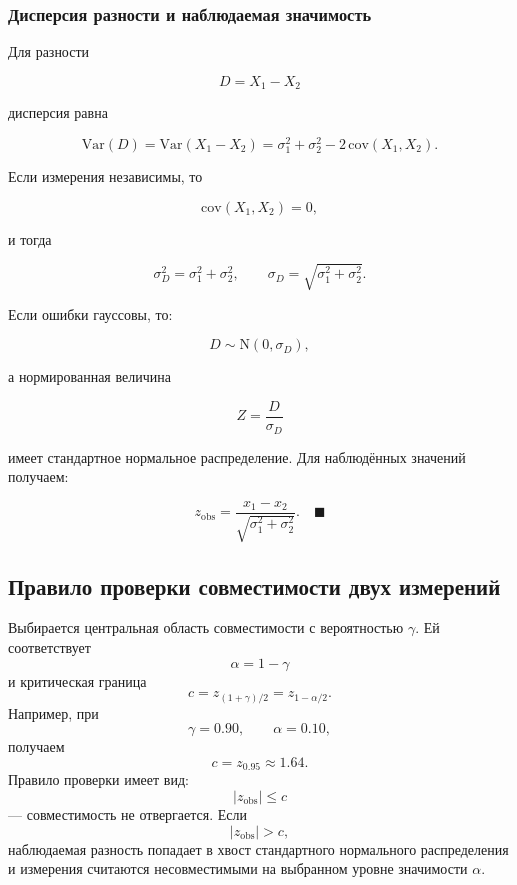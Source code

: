\documentclass[
  russian,
  12pt,
  a4paper,
  a4paper,
  openany]{scrbook}
\begin{document}
\begin{bookderivation}

\subsubsection{Дисперсия разности и наблюдаемая
значимость}\label{ux434ux438ux441ux43fux435ux440ux441ux438ux44f-ux440ux430ux437ux43dux43eux441ux442ux438-ux438-ux43dux430ux431ux43bux44eux434ux430ux435ux43cux430ux44f-ux437ux43dux430ux447ux438ux43cux43eux441ux442ux44c}

Для разности

\[D=X_1-X_2\]

дисперсия равна

\[\mathrm{Var}(D)
=\mathrm{Var}(X_1-X_2)=
\sigma_1^2+
\sigma_2^2-
2\,\mathrm{cov}(X_1,X_2).\]

Если измерения независимы, то

\[\mathrm{cov}(X_1,X_2)=0,\]

и тогда

\[\boxed{
\sigma_D^2=\sigma_1^2+\sigma_2^2,
\qquad
\sigma_D=\sqrt{\sigma_1^2+\sigma_2^2}.
}\]

Если ошибки гауссовы, то:

\[D\sim\mathrm{N}(0,\sigma_D),\]

а нормированная величина

\[Z=\frac{D}{\sigma_D}\]

имеет стандартное нормальное распределение. Для наблюдённых значений
получаем:

\[\boxed{
z_{\mathrm{obs}}
=
\frac{x_1-x_2}{\sqrt{\sigma_1^2+\sigma_2^2}}.
}\quad\blacksquare\]

\end{bookderivation}

\subsection{Правило проверки совместимости двух
измерений}\label{ux43fux440ux430ux432ux438ux43bux43e-ux43fux440ux43eux432ux435ux440ux43aux438-ux441ux43eux432ux43cux435ux441ux442ux438ux43cux43eux441ux442ux438-ux434ux432ux443ux445-ux438ux437ux43cux435ux440ux435ux43dux438ux439}

Выбирается центральная область совместимости с вероятностью \(\gamma\).
Ей соответствует \[\alpha=1-\gamma\] и критическая граница \[\boxed{
c=z_{(1+\gamma)/2}=z_{1-\alpha/2}.
}\] Например, при \[\gamma=0.90,
\qquad
\alpha=0.10,\] получаем \[c=z_{0.95}\approx1.64.\] Правило проверки
имеет вид: \[|z_{\mathrm{obs}}|\le c\] --- совместимость не отвергается.
Если \[|z_{\mathrm{obs}}|>c,\] наблюдаемая разность попадает в хвост
стандартного нормального распределения и измерения считаются
несовместимыми на выбранном уровне значимости \(\alpha\).
\end{document}
